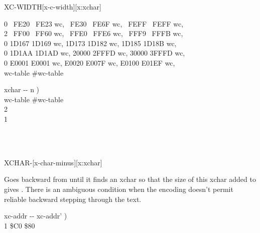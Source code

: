\begin{worddef*}{}{XC-WIDTH}[x-c-width][x:xchar]
\begin{implement}
	0 ~FE20 ~FE23 wc, ~FE30 ~FE6F wc, ~FEFF ~FEFF wc,\\
	2 ~FF00 ~FF60 wc, ~FFE0 ~FFE6 wc, ~FFF9 ~FFFB wc,\\
	0 1D167 1D169 wc, 1D173 1D182 wc, 1D185 1D18B wc,\\
	0 1D1AA 1D1AD wc, 20000 2FFFD wc, 30000 3FFFD wc,\\
	0 E0001 E0001 wc, E0020 E007F wc, E0100 E01EF wc,\\
	 wc-table \word{-}  \#wc-table

	 

	\word{:}   xchar -{}- n ) \\
	\tab wc-table \#wc-table  \word{+}   \\
	\tab[2]     
		  2  \word{+}     \\
	    1 \word{;}
	\end{implement}

	\begin{testing}
		 \\
		 \\
	\end{testing}
\end{worddef*}


\begin{worddef*}{}{XCHAR-}[x-char-minus][x:xchar]
\item {}

	Goes backward from  until it finds an xchar so that the
	size of this xchar added to  gives .
	There is an ambiguous condition when the encoding doesn't permit reliable
	backward stepping through the text.

	\begin{implement}
	\word{:}   xc-addr -{}- xc-addr' ) \\
	\tab {}  1  \word{-}   \$C0  \$80   \word{;}
	\end{implement}
\end{worddef*}


